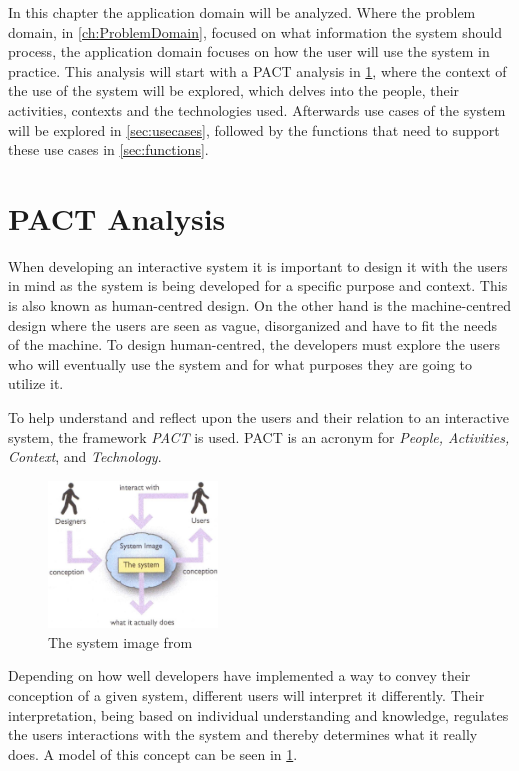 In this chapter the application domain will be analyzed.
Where the problem domain, in \cref{ch:ProblemDomain}, focused on what information the system should process, the application domain focuses on how the user will use the system in practice.
This analysis will start with a PACT \cite{Benyon} analysis in \cref{sec:PACT}, where the context of the use of the system will be explored, which delves into the people, their activities, contexts and the technologies used.
Afterwards use cases of the system will be explored in \cref{sec:usecases}, followed by the functions that need to support these use cases in \cref{sec:functions}.

\section{PACT Analysis}\label{sec:PACT}
When developing an interactive system it is important to design it with the users in mind as the system is being developed for a specific purpose and context.
This is also known as human-centred design.
On the other hand is the machine-centred design where the users are seen as vague, disorganized and have to fit the needs of the machine.
To design human-centred, the developers must explore the users who will eventually use the system and for what purposes they are going to utilize it.

To help understand and reflect upon the users and their relation to an interactive system, the framework \textit{PACT} \cite{Benyon} is used.
PACT is an acronym for \textit{People, Activities, Context}, and \textit{Technology}.

\begin{figure}[H]
	\centering
	\includegraphics[width=0.40\textwidth]{billeder/SystemImage-Benyon.jpg}
	\caption{The system image from \citep[p.~31]{Benyon}}
	\label{fig:PACT-SystemImage}
\end{figure}

Depending on how well developers have implemented a way to convey their conception of a given system, different users will interpret it differently.
Their interpretation, being based on individual understanding and knowledge, regulates the users interactions with the system and thereby determines what it really does.
A model of this concept can be seen in \cref{fig:PACT-SystemImage}.

